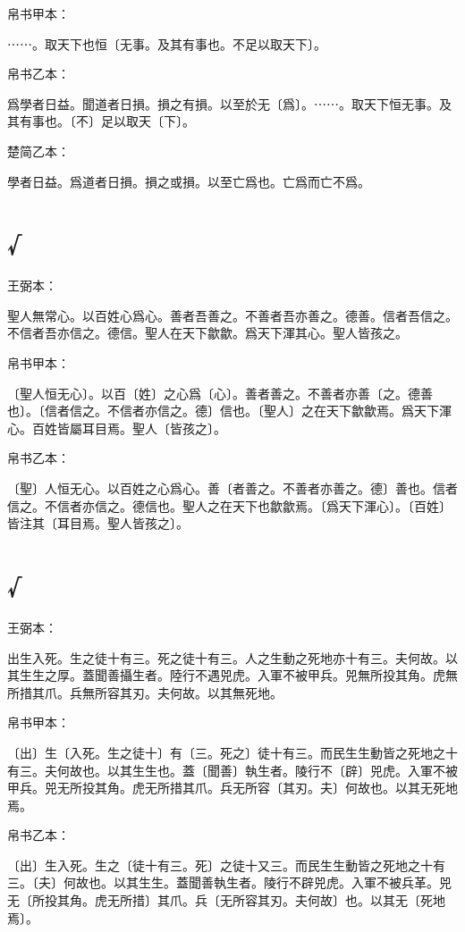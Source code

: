 \documentclass[a5paper]{ctexbook}
\begin{document}
    
    帛书甲本：

    ⋯⋯。取天下也恒〔无事。及其有事也。不足以取天下〕。

    帛书乙本：

    爲學者日益。聞道者日損。損之有損。以至於无〔爲〕。⋯⋯。取天下恒无事。及其有事也。〔不〕足以取天〔下〕。

    楚简乙本：

    學者日益。爲道者日損。損之或損。以至亡爲也。亡爲而亡不爲。

    \chapter{√}
    王弼本：

    聖人無常心。以百姓心爲心。善者吾善之。不善者吾亦善之。德善。信者吾信之。不信者吾亦信之。德信。聖人在天下歙歙。爲天下渾其心。聖人皆孩之。

    
    帛书甲本：

    〔聖人恒无心〕。以百〔姓〕之心爲〔心〕。善者善之。不善者亦善〔之。德善也〕。〔信者信之。不信者亦信之。德〕信也。〔聖人〕之在天下歙歙焉。爲天下渾心。百姓皆屬耳目焉。聖人〔皆孩之〕。

    帛书乙本：

    〔聖〕人恒无心。以百姓之心爲心。善〔者善之。不善者亦善之。德〕善也。信者信之。不信者亦信之。德信也。聖人之在天下也歙歙焉。〔爲天下渾心〕。〔百姓〕皆注其〔耳目焉。聖人皆孩之〕。

    \chapter{√}
    王弼本：

    出生入死。生之徒十有三。死之徒十有三。人之生動之死地亦十有三。夫何故。以其生生之厚。蓋聞善攝生者。陸行不遇兕虎。入軍不被甲兵。兕無所投其角。虎無所措其爪。兵無所容其刃。夫何故。以其無死地。

    
    帛书甲本：

    〔出〕生〔入死。生之徒十〕有〔三。死之〕徒十有三。而民生生動皆之死地之十有三。夫何故也。以其生生也。蓋〔聞善〕執生者。陵行不〔辟〕兕虎。入軍不被甲兵。兕无所投其角。虎无所措其爪。兵无所容〔其刃。夫〕何故也。以其无死地焉。

    帛书乙本：

    〔出〕生入死。生之〔徒十有三。死〕之徒十又三。而民生生動皆之死地之十有三。〔夫〕何故也。以其生生。蓋聞善執生者。陵行不辟兕虎。入軍不被兵革。兕无〔所投其角。虎无所措〕其爪。兵〔无所容其刃。夫何故〕也。以其无〔死地焉〕。
\end{document}
